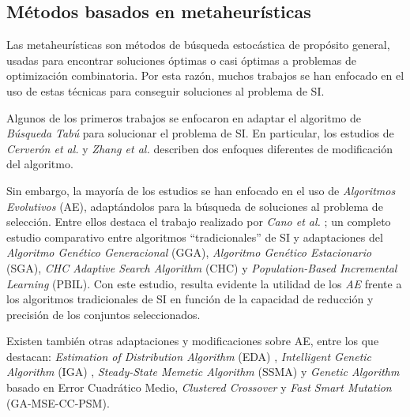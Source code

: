 \subsection{Métodos basados en metaheurísticas}

Las metaheurísticas son métodos de búsqueda estocástica de propósito general, usadas para encontrar soluciones óptimas o casi óptimas a problemas de optimización combinatoria. Por esta razón, muchos trabajos se han enfocado en el uso de estas técnicas para conseguir soluciones al problema de SI.

Algunos de los primeros trabajos se enfocaron en adaptar el algoritmo de \emph{Búsqueda Tabú} para solucionar el problema de SI. En particular, los estudios de \emph{Cerverón et al.} \cite{cerveron2001another} y \emph{Zhang et al.} \cite{zhang2002optimal} describen dos enfoques diferentes de modificación del algoritmo.

Sin embargo, la mayoría de los estudios se han enfocado en el uso de \emph{Algoritmos Evolutivos} (AE), adaptándolos para la búsqueda de soluciones al problema de selección. Entre ellos destaca el trabajo realizado por \emph{Cano et al.} \cite{cano2003using}; un completo estudio comparativo entre algoritmos ``tradicionales'' de SI y adaptaciones del \emph{Algoritmo Genético Generacional} (GGA), \emph{Algoritmo Genético Estacionario} (SGA), \emph{CHC Adaptive Search Algorithm} (CHC) y \emph{Population-Based Incremental Learning} (PBIL). Con este estudio, resulta evidente la utilidad de los \emph{AE} frente a los algoritmos tradicionales de SI en función de la capacidad de reducción y precisión de los conjuntos seleccionados.

Existen también otras adaptaciones y modificaciones sobre AE, entre los que destacan: \emph{Estimation of Distribution Algorithm} (EDA) \cite{sierra2001prototype}, \emph{Intelligent Genetic Algorithm} (IGA) \cite{ho2002design}, \emph{Steady-State Memetic Algorithm} (SSMA) \cite{garcia2008memetic} y \emph{Genetic Algorithm} \cite{gil2008evolving} basado en Error Cuadrático Medio, \emph{Clustered Crossover} y \emph{Fast Smart Mutation} (GA-MSE-CC-PSM).

